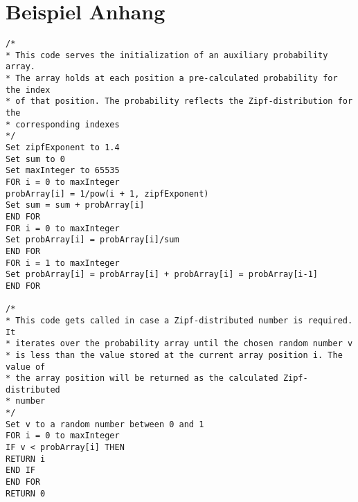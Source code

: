 %
%
\chapter{Beispiel Anhang}
\small{
\begin{verbatim}
/*
* This code serves the initialization of an auxiliary probability array.
* The array holds at each position a pre-calculated probability for the index
* of that position. The probability reflects the Zipf-distribution for the
* corresponding indexes
*/
Set zipfExponent to 1.4
Set sum to 0
Set maxInteger to 65535
FOR i = 0 to maxInteger
probArray[i] = 1/pow(i + 1, zipfExponent)
Set sum = sum + probArray[i]
END FOR
FOR i = 0 to maxInteger
Set probArray[i] = probArray[i]/sum
END FOR
FOR i = 1 to maxInteger
Set probArray[i] = probArray[i] + probArray[i] = probArray[i-1]
END FOR

/*
* This code gets called in case a Zipf-distributed number is required. It
* iterates over the probability array until the chosen random number v
* is less than the value stored at the current array position i. The value of
* the array position will be returned as the calculated Zipf-distributed
* number
*/
Set v to a random number between 0 and 1
FOR i = 0 to maxInteger
IF v < probArray[i] THEN
RETURN i
END IF
END FOR
RETURN 0

\end{verbatim}
}
